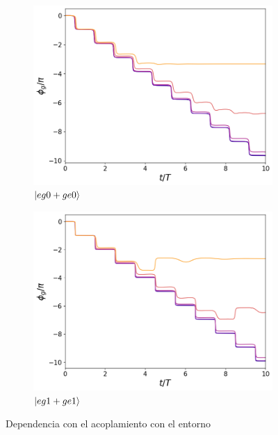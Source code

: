 \begin{figure}[h]
    \centering
    \begin{subfigure}{0.49\textwidth}
        \includegraphics[width=\textwidth]{figuras/ch5/dependencia/eg0+/acoplamiento d=0.1g.png}
        \caption{$\ket{eg0+ge0}$}
        \label{fig5:dependencia acoplamiento eg0}
    \end{subfigure}
    \hfill
    \begin{subfigure}{0.49\textwidth}
        \includegraphics[width=\textwidth]{figuras/ch5/dependencia/eg1+/acoplamiento d=0.1g.png}
        \caption{$\ket{eg1+ge1}$}
        \label{fig5:dependencia acoplamiento eg1}
    \end{subfigure}
    \caption{Dependencia con el acoplamiento con el entorno}
    \label{fig5:dependencia acoplamiento}
\end{figure}
